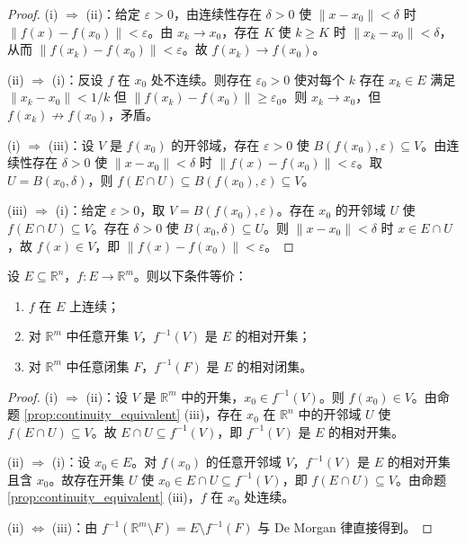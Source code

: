 \begin{proof}
(i) $\Rightarrow$ (ii)：给定 $\varepsilon > 0$，由连续性存在 $\delta > 0$ 使 $\|x - x_0\| < \delta$ 时 $\|f(x) - f(x_0)\| < \varepsilon$。由 $x_k \to x_0$，存在 $K$ 使 $k \ge K$ 时 $\|x_k - x_0\| < \delta$，从而 $\|f(x_k) - f(x_0)\| < \varepsilon$。故 $f(x_k) \to f(x_0)$。

(ii) $\Rightarrow$ (i)：反设 $f$ 在 $x_0$ 处不连续。则存在 $\varepsilon_0 > 0$ 使对每个 $k$ 存在 $x_k \in E$ 满足 $\|x_k - x_0\| < 1/k$ 但 $\|f(x_k) - f(x_0)\| \ge \varepsilon_0$。则 $x_k \to x_0$，但 $f(x_k) \not\to f(x_0)$，矛盾。

(i) $\Rightarrow$ (iii)：设 $V$ 是 $f(x_0)$ 的开邻域，存在 $\varepsilon > 0$ 使 $B(f(x_0), \varepsilon) \subseteq V$。由连续性存在 $\delta > 0$ 使 $\|x - x_0\| < \delta$ 时 $\|f(x) - f(x_0)\| < \varepsilon$。取 $U = B(x_0, \delta)$，则 $f(E \cap U) \subseteq B(f(x_0), \varepsilon) \subseteq V$。

(iii) $\Rightarrow$ (i)：给定 $\varepsilon > 0$，取 $V = B(f(x_0), \varepsilon)$。存在 $x_0$ 的开邻域 $U$ 使 $f(E \cap U) \subseteq V$。存在 $\delta > 0$ 使 $B(x_0, \delta) \subseteq U$。则 $\|x - x_0\| < \delta$ 时 $x \in E \cap U$，故 $f(x) \in V$，即 $\|f(x) - f(x_0)\| < \varepsilon$。
\end{proof}

\begin{theorem}[连续映射的全局刻画]\label{thm:continuity_global}
设 $E \subseteq \mathbb{R}^n$，$f: E \to \mathbb{R}^m$。则以下条件等价：
\begin{enumerate}[label=(\roman*)]
    \item $f$ 在 $E$ 上连续；
    \item 对 $\mathbb{R}^m$ 中任意开集 $V$，$f^{-1}(V)$ 是 $E$ 的相对开集；
    \item 对 $\mathbb{R}^m$ 中任意闭集 $F$，$f^{-1}(F)$ 是 $E$ 的相对闭集。
\end{enumerate}
\end{theorem}

\begin{proof}
(i) $\Rightarrow$ (ii)：设 $V$ 是 $\mathbb{R}^m$ 中的开集，$x_0 \in f^{-1}(V)$。则 $f(x_0) \in V$。由命题 \ref{prop:continuity_equivalent} (iii)，存在 $x_0$ 在 $\mathbb{R}^n$ 中的开邻域 $U$ 使 $f(E \cap U) \subseteq V$。故 $E \cap U \subseteq f^{-1}(V)$，即 $f^{-1}(V)$ 是 $E$ 的相对开集。

(ii) $\Rightarrow$ (i)：设 $x_0 \in E$。对 $f(x_0)$ 的任意开邻域 $V$，$f^{-1}(V)$ 是 $E$ 的相对开集且含 $x_0$。故存在开集 $U$ 使 $x_0 \in E \cap U \subseteq f^{-1}(V)$，即 $f(E \cap U) \subseteq V$。由命题 \ref{prop:continuity_equivalent} (iii)，$f$ 在 $x_0$ 处连续。

(ii) $\iff$ (iii)：由 $f^{-1}(\mathbb{R}^m \setminus F) = E \setminus f^{-1}(F)$ 与 De Morgan 律直接得到。
\end{proof}


